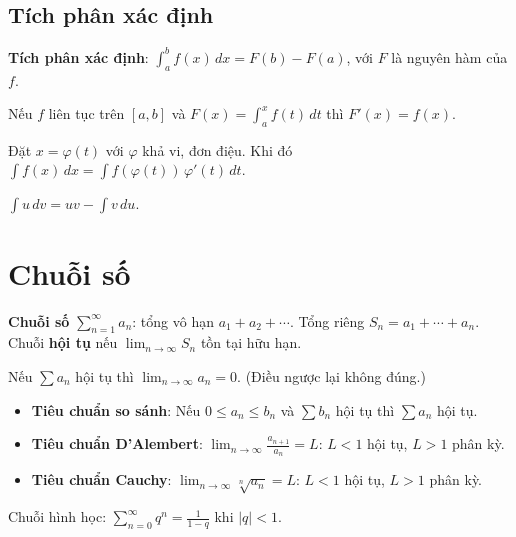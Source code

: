 \documentclass[12pt,a4paper]{article}
\begin{document}
\subsection{Tích phân xác định}

\begin{dinhnghia}
  \textbf{Tích phân xác định}: $\displaystyle\int_a^b f(x)\,dx = F(b) - F(a)$, với $F$ là nguyên hàm của $f$.
\end{dinhnghia}

\begin{dinhly}[title={Định lý cơ bản của giải tích}]
  Nếu $f$ liên tục trên $[a,b]$ và $F(x) = \displaystyle\int_a^x f(t)\,dt$ thì $F'(x) = f(x)$.
\end{dinhly}

\begin{phuongphap}[title={Phương pháp đổi biến}]
  Đặt $x = \varphi(t)$ với $\varphi$ khả vi, đơn điệu. Khi đó $\displaystyle\int f(x)\,dx = \int f(\varphi(t))\,\varphi'(t)\,dt$.
\end{phuongphap}

\begin{phuongphap}[title={Tích phân từng phần}]
  $\displaystyle\int u\,dv = uv - \int v\,du$.
\end{phuongphap}

\section{Chuỗi số}

\begin{dinhnghia}
  \textbf{Chuỗi số} $\displaystyle\sum_{n=1}^{\infty} a_n$: tổng vô hạn $a_1 + a_2 + \cdots$. Tổng riêng $S_n = a_1 + \cdots + a_n$. Chuỗi \textbf{hội tụ} nếu $\lim_{n \to \infty} S_n$ tồn tại hữu hạn.
\end{dinhnghia}

\begin{dinhly}[title={Điều kiện cần hội tụ}]
  Nếu $\displaystyle\sum a_n$ hội tụ thì $\lim_{n \to \infty} a_n = 0$. (Điều ngược lại không đúng.)
\end{dinhly}

\begin{dinhly}[title={Chuỗi dương}]
  \begin{itemize}
    \item \textbf{Tiêu chuẩn so sánh}: Nếu $0 \le a_n \le b_n$ và $\sum b_n$ hội tụ thì $\sum a_n$ hội tụ.
    \item \textbf{Tiêu chuẩn D'Alembert}: $\displaystyle\lim_{n \to \infty} \frac{a_{n+1}}{a_n} = L$: $L < 1$ hội tụ, $L > 1$ phân kỳ.
    \item \textbf{Tiêu chuẩn Cauchy}: $\displaystyle\lim_{n \to \infty} \sqrt[n]{a_n} = L$: $L < 1$ hội tụ, $L > 1$ phân kỳ.
  \end{itemize}
\end{dinhly}

\begin{congthuc}
  Chuỗi hình học: $\displaystyle\sum_{n=0}^{\infty} q^n = \frac{1}{1-q}$ khi $|q| < 1$.
\end{congthuc}
\end{document}
